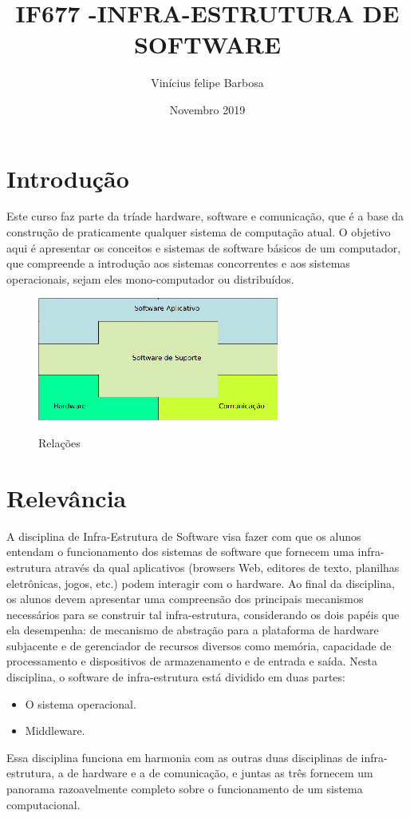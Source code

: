 \documentclass{article}
\title{IF677 -INFRA-ESTRUTURA DE SOFTWARE}
\author{Vinícius felipe Barbosa}
\date{Novembro 2019}
\begin{document}
\maketitle

\section{Introdução}
Este curso faz parte da tríade hardware, software e comunicação, que é a base da construção de praticamente qualquer sistema de computação atual. O objetivo aqui é apresentar os conceitos e sistemas de software básicos de um computador, que compreende a introdução aos sistemas concorrentes e aos sistemas operacionais, sejam eles mono-computador ou distribuídos.
\citep{chamado1}
\begin{figure}[h!]
\centering
\includegraphics[scale=1.2]{img.jpg}
\citep{chamado2}
\caption{Relações}
\label{fig: img}
\end{figure}


\section{Relevância}
A disciplina de Infra-Estrutura de Software visa fazer com que os alunos entendam o funcionamento dos sistemas de software que fornecem uma infra-estrutura através da qual aplicativos (browsers Web, editores de texto, planilhas eletrônicas, jogos, etc.) podem interagir com o hardware. Ao final da disciplina, os alunos devem apresentar uma compreensão dos principais mecanismos necessários para se construir tal infra-estrutura, considerando os dois papéis que ela desempenha: de mecanismo de abstração para a plataforma de hardware subjacente e de gerenciador de recursos diversos como memória, capacidade de processamento e dispositivos de armazenamento e de entrada e saída. Nesta disciplina, o software de infra-estrutura está dividido em duas partes: 
\begin{itemize}
\item O sistema operacional.
\item Middleware.
 \end{itemize}
 Essa disciplina funciona em harmonia com as outras duas disciplinas de infra-estrutura, a de hardware e a de comunicação, e juntas as três fornecem um panorama razoavelmente completo sobre o funcionamento de um sistema computacional.
 \citep{chamado1}


\end{document}
